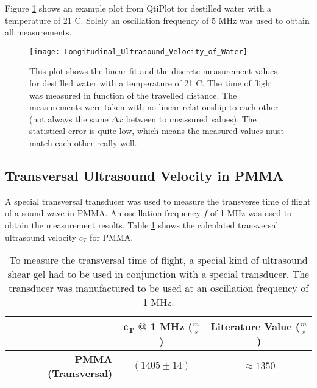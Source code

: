 Figure \ref{fig:Longitudinal_Ultrasound_Velocity_of_Water} shows an example plot from QtiPlot for destilled water with a temperature of 21 \textdegree C. Solely an oscillation frequency of 5 MHz was used to obtain all measurements.

\begin{figure}[H]
	\centering
	\texttt{[image: Longitudinal\_Ultrasound\_Velocity\_of\_Water]}
	\caption{This plot shows the linear fit and the discrete measurement values for destilled water with a temperature of 21 \textdegree C. The time of flight was measured in function of the travelled distance. The measurements were taken with no linear relationship to each other (not always the same $\Delta x$ between to meassured values). The statistical error is quite low, which means the measured values must match each other really well.}
	\label{fig:Longitudinal_Ultrasound_Velocity_of_Water}
\end{figure}

\newpage
\subsection{Transversal Ultrasound Velocity in PMMA}
\label{subsec:Transversal_Ultrasound_Velocity_in_PMMA}
A special transversal transducer was used to measure the transverse time of flight of a sound wave in PMMA. An oscillation frequency $f$ of 1 MHz was used to obtain the measurement results. Table \ref{tab:Transversal_Ultrasound_Velocity_in_PMMA} shows the calculated transversal ultrasound velocity $c_T$ for PMMA.

\begin{table}[H]
	\centering
	\renewcommand{\arraystretch}{1.3}
	\begin{tabular}{r||c|c}
		& $\boldsymbol{c_T}$ \textbf{@ 1 MHz} ($\frac{\si{m}}{\si{s}}$) & \textbf{Literature Value} ($\frac{\si{m}}{\si{s}}$) \cite{kohlrausch} \\
		\hline\hline
		\textbf{PMMA (Transversal)} & $(1405\pm 14)$ & $\approx 1350$ \\
	\end{tabular}
	\caption{To measure the transversal time of flight, a special kind of ultrasound shear gel had to be used in conjunction with a special transducer. The transducer was manufactured to be used at an oscillation frequency of 1 MHz.}
	\label{tab:Transversal_Ultrasound_Velocity_in_PMMA}
\end{table}

